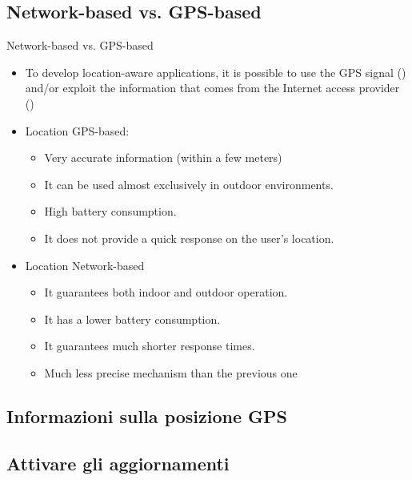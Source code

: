 \documentclass{beamer}
\begin{document}
\subsection{Network-based vs. GPS-based}
  \begin{frame}{Network-based vs. GPS-based}
    \begin{itemize}\itemsep10pt
      \item To develop location-aware applications, it is possible to use the
      GPS signal () and/or exploit the information that
      comes from the Internet access provider ()
      \item Location GPS-based:
      \begin{itemize}
        \item Very accurate information (within a few meters)
        \item It can be used almost exclusively in outdoor environments.
        \item High battery consumption.
        \item It does not provide a quick response on the user's location.
      \end{itemize}
      \item Location Network-based
      \begin{itemize}
        \item It guarantees both indoor and outdoor operation.
        \item It has a lower battery consumption.
        \item It guarantees much shorter response times.
        \item Much less precise mechanism than the previous one
      \end{itemize}
    \end{itemize}
  \end{frame}

\subsection{Informazioni sulla posizione GPS}

\subsection*{Attivare gli aggiornamenti}
\end{document}
